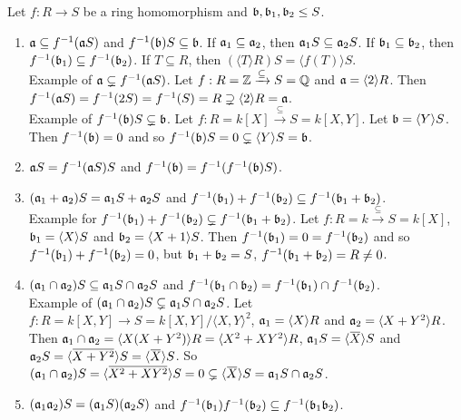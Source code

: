 \begin{proposition}
    Let $f: R \to S$ be a ring homomorphism and $\mathfrak{b},\mathfrak{b}_1,\mathfrak{b}_2 \leq S$.
    \begin{enumerate}
        \item $\mathfrak{a} \subseteq f^{-1}(\mathfrak{a} S)$ and $f^{-1}(\mathfrak{b})S \subseteq \mathfrak{b}$. If $\mathfrak{a}_1 \subseteq \mathfrak{a}_2$, then $\mathfrak{a}_1S \subseteq \mathfrak{a}_2S$. If $\mathfrak{b}_1 \subseteq \mathfrak{b}_2$, then $f^{-1}(\mathfrak{b}_1) \subseteq f^{-1}(\mathfrak{b}_2)$. If $T \subseteq R$, then $(\langle T \rangle R) S = \langle f(T) \rangle S$. \\
            Example of $\mathfrak{a} \subsetneq f^{-1}(\mathfrak{a} S)$. Let $f: R = \mathbb{Z} \xrightarrow {\subseteq} S = \mathbb{Q}$ and $\mathfrak{a} = \langle 2 \rangle R$. Then $f^{-1}(\mathfrak{a} S) = f^{-1}(2S) = f^{-1}(S) = R \supsetneq \langle 2 \rangle R = \mathfrak{a}$. \\
            Example of $f^{-1}(\mathfrak{b})S \subsetneq \mathfrak{b}$. Let $f: R = k[X] \xrightarrow {\subseteq } S = k[X,Y]$. Let $\mathfrak{b} = \langle Y \rangle S$. Then $f^{-1}(\mathfrak{b}) = 0$ and so $f^{-1}(\mathfrak{b})S = 0 \subsetneq \langle Y \rangle S = \mathfrak{b}$.
        \item $\mathfrak{a} S = f^{-1}(\mathfrak{a} S)S$ and $f^{-1}(\mathfrak{b}) = f^{-1}(f^{-1}(\mathfrak{b})S)$.
        \item $(\mathfrak{a}_1 + \mathfrak{a}_2)S = \mathfrak{a}_1S + \mathfrak{a}_2S$ and $f^{-1}(\mathfrak{b}_1) + f^{-1}(\mathfrak{b}_2) \subseteq f^{-1}(\mathfrak{b}_1 + \mathfrak{b}_2)$. \\
            Example for $f^{-1}(\mathfrak{b}_1) + f^{-1}(\mathfrak{b}_2) \subsetneq f^{-1}(\mathfrak{b}_1+\mathfrak{b}_2)$. Let $f: R = k \xrightarrow \subseteq S = k[X]$, $\mathfrak{b}_1 = \langle X \rangle S$ and $\mathfrak{b}_2 = \langle X+1 \rangle S$. Then $f^{-1}(\mathfrak{b}_1) = 0 = f^{-1}(\mathfrak{b}_2)$ and so $f^{-1}(\mathfrak{b}_1) + f^{-1}(\mathfrak{b}_2) = 0$, but $\mathfrak{b}_1 + \mathfrak{b}_2 = S$, $f^{-1}(\mathfrak{b}_1 + \mathfrak{b}_2) = R \neq 0$.
        \item $(\mathfrak{a}_1 \cap \mathfrak{a}_2)S \subseteq \mathfrak{a}_1S \cap \mathfrak{a}_2S$ and $f^{-1}(\mathfrak{b}_1 \cap \mathfrak{b}_2) = f^{-1}(\mathfrak{b}_1) \cap f^{-1}(\mathfrak{b}_2)$. \\
            Example of $(\mathfrak{a}_1 \cap \mathfrak{a}_2)S \subsetneq \mathfrak{a}_1S \cap \mathfrak{a}_2S$. Let $f: R = k[X,Y] \to S = k[X,Y]/\langle X,Y \rangle^2$, $\mathfrak{a}_1 = \langle X \rangle R$ and $\mathfrak{a}_2 = \langle X+Y^2 \rangle R$. Then $\mathfrak{a}_1 \cap \mathfrak{a}_2 = \langle X(X+Y^2) \rangle R = \langle X^2 + XY^2 \rangle R$, $\ffa_1 S = \langle \overbar X \rangle S$ and $\ffa_2 S = \langle \overbar{X+Y^2} \rangle S = \langle \overbar X \rangle S$. So $(\ffa_1 \cap \ffa_2)S = \langle \overbar{X^2+XY^2} \rangle S = 0 \subsetneq \langle \overbar X \rangle S = \ffa_1 S \cap \ffa_2 S$.
        \item $(\mathfrak{a}_1\mathfrak{a}_2)S = (\mathfrak{a}_1S)(\mathfrak{a}_2S)$ and $f^{-1}(\mathfrak{b}_1)f^{-1}(\mathfrak{b}_2) \subseteq f^{-1}(\mathfrak{b}_1\mathfrak{b}_2)$. \\

\end{enumerate}
\end{proposition}

